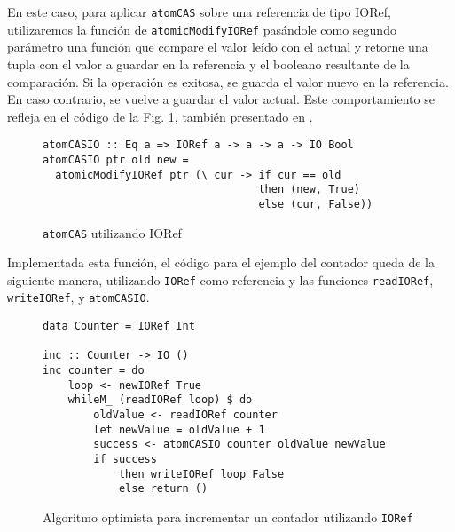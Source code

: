 En este caso, para aplicar \texttt{atomCAS} sobre una referencia de tipo IORef, utilizaremos la función de \texttt{atomicModifyIORef} pasándole como segundo parámetro una función que compare el valor leído con el actual y retorne una tupla
con el valor a guardar en la referencia y el booleano resultante de la comparación.
Si la operación es exitosa, se guarda el valor nuevo en la referencia.
En caso contrario, se vuelve a guardar el valor actual.
Este comportamiento se refleja en el código de la Fig. \ref{fig:atomcasio}, también presentado en \cite{linked-list}.

\begin{figure}[H]
\begin{verbatim}
atomCASIO :: Eq a => IORef a -> a -> a -> IO Bool
atomCASIO ptr old new =
  atomicModifyIORef ptr (\ cur -> if cur == old
                                  then (new, True)
                                  else (cur, False))
\end{verbatim}
\caption{\texttt{atomCAS} utilizando IORef}
\label{fig:atomcasio}
\end{figure}

Implementada esta función, el código para el ejemplo del contador queda de la siguiente manera, utilizando \texttt{IORef} como referencia y las funciones \texttt{readIORef}, \texttt{writeIORef}, y \texttt{atomCASIO}.

\begin{figure}[H]
\begin{verbatim}
data Counter = IORef Int

inc :: Counter -> IO ()
inc counter = do
    loop <- newIORef True
    whileM_ (readIORef loop) $ do
        oldValue <- readIORef counter
        let newValue = oldValue + 1
        success <- atomCASIO counter oldValue newValue
        if success
            then writeIORef loop False
            else return ()
\end{verbatim}
\caption{Algoritmo optimista para incrementar un contador utilizando \texttt{IORef}}
\label{fig:lockfree-counter-example-ioref}
\end{figure}

